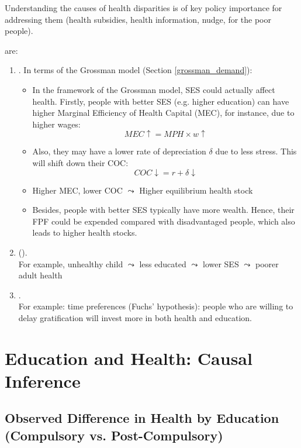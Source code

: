         Understanding the causes of health disparities is of key policy importance for addressing them (health subsidies, health information, nudge, for the poor people).
        
         are:
        \begin{enumerate}
            \item {}. In terms of the Grossman model (Section \ref{grossman_demand}):
            \begin{itemize}
                \item In the framework of the Grossman model, SES could actually affect health.
                Firstly, people with better SES (e.g. higher education) can have higher Marginal Efficiency of Health Capital (MEC), for instance, due to higher wages:
                $$MEC\uparrow=MPH\times w\uparrow$$
                \item Also, they may have a lower rate of depreciation $\delta$ due to less stress. This will shift down their COC:
                $$COC\downarrow=r+\delta \downarrow$$
                \item Higher MEC, lower COC $\leadsto$ Higher equilibrium health stock
                \item Besides, people with better SES typically have more wealth. Hence, their FPF could be expended compared with disadvantaged people, which also leads to higher health stocks.
            \end{itemize}
            \item {} ().\\
            For example, unhealthy child $\leadsto$ less educated $\leadsto$ lower SES $\leadsto$ poorer adult health
            
            \item {}.\\
            For example: time preferences (Fuchs’ hypothesis): people who are willing to delay gratification will invest more in both health and education.
        \end{enumerate}

\section{Education and Health: Causal Inference}

    \subsection{Observed Difference in Health by Education (Compulsory vs. Post-Compulsory)}
    
